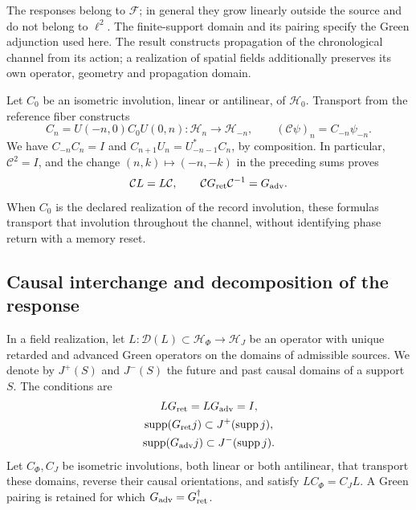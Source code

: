 The responses belong to \(\mathcal F\); in general they grow
linearly outside the source and do not belong to \(\ell^2\).
The finite-support domain and its pairing specify the Green adjunction
used here. The result constructs propagation of the chronological
channel from its action; a realization of spatial fields additionally preserves
its own operator, geometry and propagation domain.

Let \(C_0\) be an isometric involution, linear or antilinear, of
\(\mathcal H_0\). Transport from the reference fiber constructs
\[
 C_n=U(-n,0)C_0U(0,n):\mathcal H_n\longrightarrow\mathcal H_{-n},
 \qquad (\mathcal C\psi)_n=C_{-n}\psi_{-n}.
\]
We have \(C_{-n}C_n=I\) and
\(C_{n+1}U_n=U_{-n-1}^*C_n\), by composition.
In particular, \(\mathcal C^2=I\), and the change \((n,k)\mapsto(-n,-k)\)
in the preceding sums proves
\begin{equation}
 \mathcal C L=L\mathcal C,\qquad
 \mathcal C G_{\rm ret}\mathcal C^{-1}=G_{\rm adv}.
 \label{vii:vii:eq:intercambio-green-cronologico}
\end{equation}
When \(C_0\) is the declared realization of the record involution,
these formulas transport that involution throughout the channel, without identifying
phase return with a memory reset.

\subsection{Causal interchange and decomposition of the response}
\label{vii:vii:subsec:green-realizacion-campos}

In a field realization, let
\(L:\mathcal D(L)\subset\mathcal H_\Phi\to\mathcal H_J\)
be an operator with unique retarded and advanced Green operators on the domains of
admissible sources. We denote by \(J^+(S)\) and \(J^-(S)\) the
future and past causal domains of a support \(S\). The conditions are
\[
 \begin{gathered}
 LG_{\rm ret}=LG_{\rm adv}=I,\\
 \operatorname{supp}(G_{\rm ret}j)\subset J^+(\operatorname{supp}j),\\
 \operatorname{supp}(G_{\rm adv}j)\subset J^-(\operatorname{supp}j).
 \end{gathered}
\]
Let \(C_\Phi,C_J\) be isometric involutions, both linear or both
antilinear, that transport these domains,
reverse their causal orientations, and satisfy
\(LC_\Phi=C_JL\). A Green pairing is retained for which
\(G_{\rm adv}=G_{\rm ret}^{\dagger}\).

